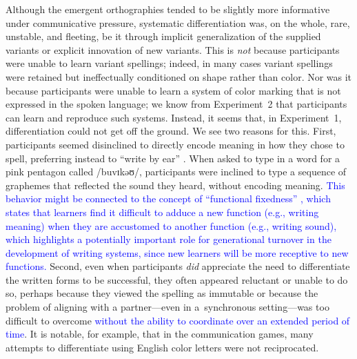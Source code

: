 \documentclass[doc,biblatex]{apa7}
\newcommand\newmaterial[1]{\textcolor{blue}{#1}}
\begin{document}
Although the emergent orthographies tended to be slightly more informative under communicative pressure, systematic differentiation was, on the whole, rare, unstable, and fleeting, be it through implicit generalization of the supplied variants or explicit innovation of new variants. This is \textit{not} because participants were unable to learn variant spellings; indeed, in many cases variant spellings were retained but ineffectually conditioned on shape rather than color. Nor was it because participants were unable to learn a system of color marking that is not expressed in the spoken language; we know from Experiment~2 that participants can learn and reproduce such systems. Instead, it seems that, in Experiment~1, differentiation could not get off the ground. We see two reasons for this. First, participants seemed disinclined to directly encode meaning in how they chose to spell, preferring instead to ``write by ear'' \parencite{Frith:1979}. When asked to type in a word for a pink pentagon called /buvɪkəʊ/, participants were inclined to type a sequence of graphemes that reflected the sound they heard, without encoding meaning. \newmaterial{This behavior might be connected to the concept of ``functional fixedness'' \parencite{German:2000}, which states that learners find it difficult to adduce a new function (e.g., writing meaning) when they are accustomed to another function (e.g., writing sound), which highlights a potentially important role for generational turnover in the development of writing systems, since new learners will be more receptive to new functions.} Second, even when participants \textit{did} appreciate the need to differentiate the written forms to be successful, they often appeared reluctant or unable to do so, perhaps because they viewed the spelling as immutable or because the problem of aligning with a partner---even in a~synchronous setting---was too difficult to overcome \newmaterial{without the ability to coordinate over an extended period of time}. It is notable, for example, that in the communication games, many attempts to differentiate using English color letters were not reciprocated.
\end{document}
